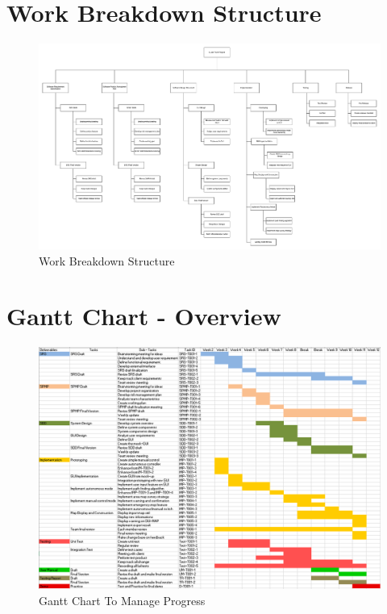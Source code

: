 \appendix
\section{Work Breakdown Structure}
\begin{figure}[H]
	\centering
	\hspace*{-1.3in}
	\includegraphics[width=1.5\linewidth]{WorkBreakDown_s.PNG}  %
	\caption{Work Breakdown Structure}
	\label{work-breakdown-structure}
\end{figure}

\section{Gantt Chart - Overview}
\begin{figure}[H]
	\centering
	\hspace*{-1.3in}
	\includegraphics[width=1.5\linewidth]{gantt-chart.PNG}  %
	\caption{Gantt Chart To Manage Progress}
	\label{gantt-chart-overview}
\end{figure}

%
